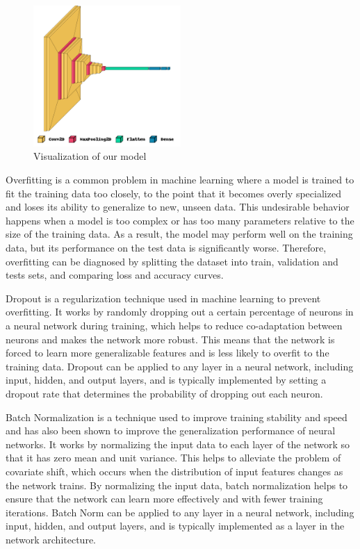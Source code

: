 \documentclass[a4paper]{article}
\begin{document}
\begin{figure}[H]
    \centering
    \includegraphics[width=0.5\textwidth]{img/baptiste/model_dropout_false_batchnorm_false.png}
    \caption{Visualization of our model}
\end{figure}


Overfitting is a common problem in machine learning where a model is trained to fit the training data too closely, to the point that it becomes overly specialized and loses its ability to generalize to new, unseen data. This undesirable behavior happens when a model is too complex or has too many parameters relative to the size of the training data. As a result, the model may perform well on the training data, but its performance on the test data is significantly worse. Therefore, overfitting can be diagnosed by splitting the dataset into train, validation and tests sets, and comparing loss and accuracy curves.


Dropout is a regularization technique used in machine learning to prevent overfitting. It works by randomly dropping out a certain percentage of neurons in a neural network during training, which helps to reduce co-adaptation between neurons and makes the network more robust. This means that the network is forced to learn more generalizable features and is less likely to overfit to the training data. Dropout can be applied to any layer in a neural network, including input, hidden, and output layers, and is typically implemented by setting a dropout rate that determines the probability of dropping out each neuron. 


Batch Normalization is a technique used to improve training stability and speed and has also been shown to improve the generalization performance of neural networks. It works by normalizing the input data to each layer of the network so that it has zero mean and unit variance. This helps to alleviate the problem of covariate shift, which occurs when the distribution of input features changes as the network trains. By normalizing the input data, batch normalization helps to ensure that the network can learn more effectively and with fewer training iterations. Batch Norm can be applied to any layer in a neural network, including input, hidden, and output layers, and is typically implemented as a layer in the network architecture.
\end{document}
